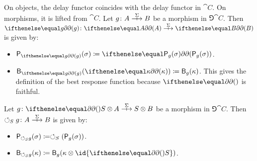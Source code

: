 \begin{definition}
On objects, the delay functor coincides with the delay functor in \(\cat{C}\).
On morphisms, it is lifted from \(\cat{C}\).
Let \(g \colon A \gamearrow{\Sigma} B\) be a morphism in \(\Game{\cat{C}}\).
Then \(\delay[g] \colon \delay[A] \gamearrow{\Sigma} \delay[B]\) is given by:
\begin{itemize}
  \item \(\play{\delay[g]}(\sigma) \defn \delay[\play{g}(\sigma)]\).
  \item \(\best{\delay[g]}(\delay[\kappa]) \defn \best{g}(\kappa)\).
    This gives the definition of the best response function because \(\delay\) is faithful.
\end{itemize}
\end{definition}
\begin{definition}
  Let \(g \colon \delay S \tensor A \gamearrow{\Sigma} S \tensor B\) be a morphism in \(\Game{\cat{C}}\).
  Then \(\fbk[S]g \colon A \gamearrow{\Sigma} B\) is given by:
  \begin{itemize}
    \item \(\play{\fbk[S]g}(\sigma) \defn \fbk[S](\play{g}(\sigma))\).
    \item \(\best{\fbk[S]g}(\kappa) \defn \best{g}(\kappa \tensor \id{\delay S})\).
  \end{itemize}
\end{definition}
